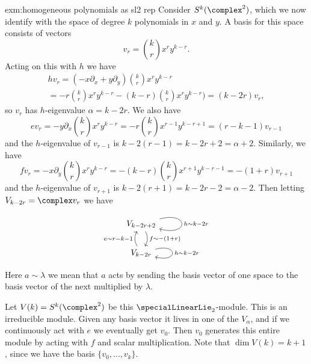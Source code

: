 \documentclass[fleqn]{NotesClass}
\begin{document}
\begin{exm}{}{exm:homogeneous polynomials as sl2 rep}
        Consider \(S^k(\complex^2)\), which we now identify with the space of degree \(k\) polynomials in \(x\) and \(y\).
        A basis for this space consists of vectors
        \begin{equation}
            v_r = \binom{k}{r} x^r y^{k - r}.
        \end{equation}
        Acting on this with \(h\) we have
        \begin{multline}
            hv_r = (-x \partial_x + y\partial_y) \binom{k}{r}x^r y^{k-r}\\
            = -r\binom{k}{r}x^ry^{k-r} -(k - r)\binom{k}{r}x^ry^{k-r}) = (k - 2r)v_r, 
        \end{multline}
        so \(v_r\) has \(h\)-eigenvalue \(\alpha = k - 2r\).
        We also have
        \begin{equation}
            ev_r = -y\partial_x \binom{k}{r} x^r y^{k-r} = -r \binom{k}{r}x^{r-1} y^{k-r+1} = (r - k - 1) v_{r-1}
        \end{equation}
        and the \(h\)-eigenvalue of \(v_{r-1}\) is \(k - 2(r - 1) = k - 2r + 2 = \alpha + 2\).
        Similarly, we have
        \begin{equation}
            fv_r = -x \partial_y \binom{k}{r} x^r y^{k-r} = -(k-r) \binom{k}{r} x^{r + 1} y^{k - r - 1} = -(1 + r)v_{r + 1}
        \end{equation}
        and the \(h\)-eigenvalue of \(v_{r + 1}\) is \(k -2(r + 1) = k - 2r - 2 = \alpha - 2\).
        Then letting \(V_{k - 2r} = \complex v_{r}\) we have
        \begin{equation}
            \begin{tikzcd}
                V_{k - 2r + 2} \arrow[loop right, "h \sim k-2r"] \arrow[d, bend left, "f \sim -(1 + r)"]\\
                V_{k - 2r} \arrow[loop right, "h \sim k-2r"] \arrow[u, bend left, "e \sim r - k - 1"]
            \end{tikzcd}
        \end{equation}
        Here \(a \sim \lambda\) we mean that \(a\) acts by sending the basis vector of one space to the basis vector of the next multiplied by \(\lambda\).
        
        Let \(V(k) = S^k(\complex^2)\) be this \(\specialLinearLie_2\)-module.
        This is an irreducible module.
        Given any basis vector it lives in one of the \(V_\alpha\), and if we continuously act with \(e\) we eventually get \(v_0\).
        Then \(v_0\) generates this entire module by acting with \(f\) and scalar multiplication.
        Note that \(\dim V(k) = k + 1\), since we have the basis \(\{v_0, \dotsc, v_k\}\).
    \end{exm}
    
\end{document}
